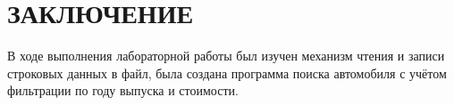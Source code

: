 \section*{ЗАКЛЮЧЕНИЕ}

В ходе выполнения лабораторной работы был изучен механизм чтения и записи
строковых данных в файл, была создана программа поиска автомобиля с учётом
фильтрации по году выпуска и стоимости.

\newpage
